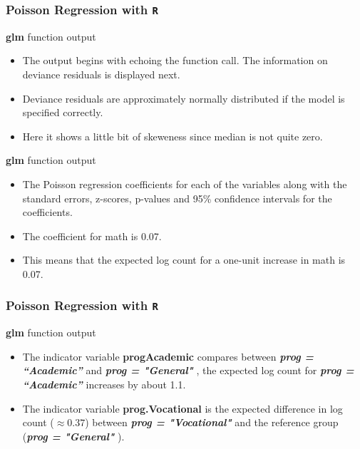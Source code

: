 \documentclass[00-GLMregslides.tex]{subfiles}
\begin{document}
\begin{frame}[fragile]

\frametitle{Poisson Regression with \texttt{R}}
\Large 
\textbf{glm} function output
\begin{itemize}
 \item The output begins with echoing the function call. The information on deviance residuals is displayed next. 
 \item Deviance residuals are approximately normally distributed if the model is specified correctly.
 \item Here it shows a little bit of skeweness since median is not quite zero. 
\end{itemize}
\end{frame}
\begin{frame}
\Large 
\textbf{glm} function output
\begin{itemize}
\item The Poisson regression coefficients for each of the variables along with the standard errors, z-scores, p-values 
and 95\% confidence intervals for the coefficients. 
\item The coefficient for math is 0.07.
\item This means that the expected log count for a one-unit increase in math is 0.07. 
\end{itemize}
\end{frame}
\begin{frame}[fragile]
\frametitle{Poisson Regression with \texttt{R}}
\Large 
\textbf{glm} function output
	\begin{itemize}

\item The indicator variable \textbf{progAcademic} compares between \textbf{\textit{prog = “Academic” }}and \textbf{\textit{prog = "General"}} , the expected log 
count for \textbf{\textit{prog = “Academic” }}increases by about 1.1. 
\item The indicator variable \textbf{prog.Vocational}  is the expected difference in log count (\(\approx 0.37\)) between 
\textbf{\textit{prog = "Vocational"}} and the reference group (\textbf{\textit{prog = "General"}} ).
\end{itemize}
\end{frame}
\end{document}
